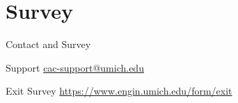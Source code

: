\documentclass[handout]{beamer}
\begin{document}
  \section{Survey}
  \begin{frame}{Contact and Survey}
   \begin{block}{Support}
    \url{cac-support@umich.edu}
   \end{block}
   \begin{block}{Exit Survey}
    \url{https://www.engin.umich.edu/form/exit}
   \end{block}
  \end{frame}
\end{document}
